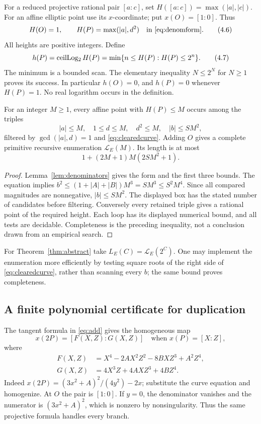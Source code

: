 For a reduced projective rational pair $[a:c]$, set
$H([a:c])=\max(|a|,|c|)$. For an affine elliptic point use its
$x$-coordinate; put $x(O)=[1:0]$. Thus
\[
 H(O)=1,\qquad H(P)=\max(|a|,d^2)
 \quad\hbox{in \eqref{eq:denomform}}.
 \tag{4.6}
\]
All heights are positive integers. Define
\[
 h(P)=\operatorname{ceilLog_2} H(P)=\min\{n\le H(P):H(P)\le2^n\}.
 \tag{4.7}\label{eq:binaryheight}
\]
The minimum is a bounded scan. The elementary inequality $N\le2^N$
for $N\ge1$ proves its success. In particular $h(O)=0$, and
$h(P)=0$ whenever $H(P)=1$. No real logarithm occurs in the definition.

\begin{lemma}\label{lem:ell-enum}
For an integer $M\ge1$, every affine point with $H(P)\le M$ occurs among
the triples
\[
 |a|\le M,\quad 1\le d\le M,\quad d^2\le M,\quad
 |b|\le SM^2,
 \tag{4.8}\label{eq:box}
\]
filtered by $\gcd(|a|,d)=1$ and \eqref{eq:clearedcurve}.
Adding $O$ gives a complete primitive recursive enumeration
$\mathcal L_E(M)$. Its length is at most
\[
 1+(2M+1)M(2SM^2+1).
 \tag{4.9}
\]
\end{lemma}
\begin{proof}
Lemma~\ref{lem:denominators} gives the form and the first three bounds.
The equation implies
$b^2\le(1+|A|+|B|)M^3=SM^3\le S^2M^4$.
Since all compared magnitudes are nonnegative, $|b|\le SM^2$.
The displayed box has the stated number of candidates before filtering.
Conversely every retained triple gives a rational point of the required
height. Each loop has its displayed numerical bound, and all tests are
decidable. Completeness is the preceding inequality, not a conclusion
drawn from an empirical search.
\end{proof}

For Theorem~\ref{thm:abstract} take $L_E(C)=\mathcal L_E(2^C)$.
One may implement the enumeration more efficiently by testing square
roots of the right side of \eqref{eq:clearedcurve}, rather than scanning
every $b$; the same bound proves completeness.

\subsection{A finite polynomial certificate for duplication}
\label{subsec:dup}

The tangent formula in \eqref{eq:add} gives the homogeneous map
\[
 x(2P)=[F(X,Z):G(X,Z)]\quad\text{when }x(P)=[X:Z],
 \tag{4.10}\label{eq:dupmap}
\]
where
\[
\begin{split}
 F(X,Z)&=X^4-2AX^2Z^2-8BXZ^3+A^2Z^4,\\
 G(X,Z)&=4X^3Z+4AXZ^3+4BZ^4.
\end{split}
\tag{4.11}\label{eq:FG}
\]
Indeed $x(2P)=(3x^2+A)^2/(4y^2)-2x$; substitute the curve equation
and homogenize. At $O$ the pair is $[1:0]$.
If $y=0$, the denominator vanishes and the numerator is
$(3x^2+A)^2$, which is nonzero by nonsingularity. Thus the same
projective formula handles every branch.


